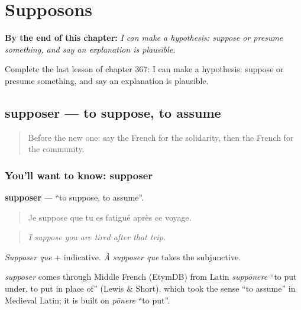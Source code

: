 
\chapter{Supposons}
\label{ch:fr-supposons}

\begin{chapteropening}
\textbf{By the end of this chapter:} \emph{I can make a hypothesis: suppose or presume something, and say an explanation is plausible.}

Complete the last lesson of chapter 367: I can make a hypothesis: suppose or presume something, and say an explanation is plausible.
\end{chapteropening}

\section[supposer]{supposer — to suppose, to assume}

\label{lesson:FR-C367-supposer}



\begin{quote}
Before the new one: say the French for the solidarity, then the French for the community.
\end{quote}

\subsection*{You'll want to know: supposer}
\textbf{supposer} — \textquotedblleft{}to suppose, to assume\textquotedblright{}.

\begin{quote}
Je suppose que tu es fatigué après ce voyage.
\end{quote}

\begin{quote}
\emph{I suppose you are tired after that trip.}
\end{quote}

\emph{Supposer que} + indicative. \emph{À supposer que} takes the subjunctive.

\begin{cousinweb}
\emph{supposer} comes through Middle French (EtymDB) from Latin \emph{suppōnere} \textquotedblleft{}to put under, to put in place of\textquotedblright{} (Lewis \& Short), which took the sense \textquotedblleft{}to assume\textquotedblright{} in Medieval Latin; it is built on \emph{pōnere} \textquotedblleft{}to put\textquotedblright{}.
\end{cousinweb}


